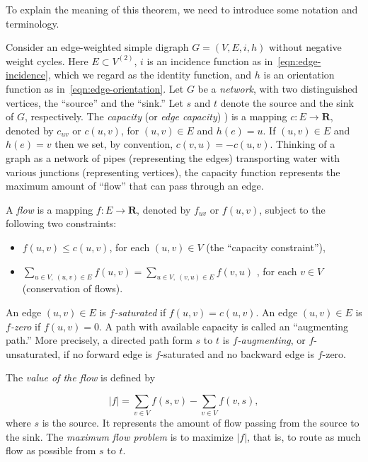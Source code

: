 To explain the meaning of this theorem, we need to introduce some
notation and  terminology.

Consider an edge-weighted simple
digraph $G=(V,E,i,h)$ without negative weight
cycles. Here $E\subset V^{(2)}$,
$i$ is an incidence function as in~\eqref{eqn:edge-incidence}, which
we regard as the identity function, and $h$ is an
orientation function as in~\eqref{eqn:edge-orientation}.
Let $G$ be a {\it network},
with two distinguished vertices, the ``source'' and the ``sink.''
Let $s$ and $t$ denote the source and the sink of $G$, respectively.
The {\it capacity} (or {\it edge capacity})
)
is a mapping $c: E \to {\mathbf{R}}$, denoted by $c_{uv}$
or $c(u,v)$, for $(u,v)\in E$ and $h(e)= u$.
If $(u,v)\in E$ and $h(e)= v$
then we set, by convention, $c(v,u)=-c(u,v)$.
Thinking of a graph as a network of pipes (representing the edges)
transporting water with various junctions (representing vertices),
the capacity function represents the maximum amount
of ``flow'' that can pass through an edge.

A {\it flow}
is a mapping $f: E \to {\mathbf{R}}$, denoted by $f_{uv}$ or
$f(u,v)$, subject to the following two constraints:
\begin{itemize}
\item
$f(u,v)\leq c(u,v)$, for each $(u,v) \in V$ (the ``capacity constraint''),
\item
$\sum_{u\in V,\ (u,v)\in E} f(u,v) = \sum_{u\in V,\ (v, u)\in E} f(v, u)$ ,
for each $v\in V$ (conservation of flows).
\end{itemize}
An edge $(u,v) \in E$ is {\it $f$-saturated}
if $f(u,v)=c(u,v)$.
An edge $(u,v) \in E$ is {\it $f$-zero} if $f(u,v)=0$.
A path with available capacity is called an ``augmenting path.''
More precisely, a directed path form $s$ to $t$ is
{\it $f$-augmenting}, or
$f$-unsaturated, if no forward
edge is $f$-saturated and no backward edge is $f$-zero.

The {\it value of the flow} is defined by

\[
| f | = \sum_{v\in V}f(s,v)-\sum_{v\in V}f(v,s),
\]
where $s$ is the source.
It represents the amount of flow passing from the source to the sink.
The {\it maximum flow problem} is to maximize $| f |$, that is, to route as
much flow as possible from $s$ to $t$.

